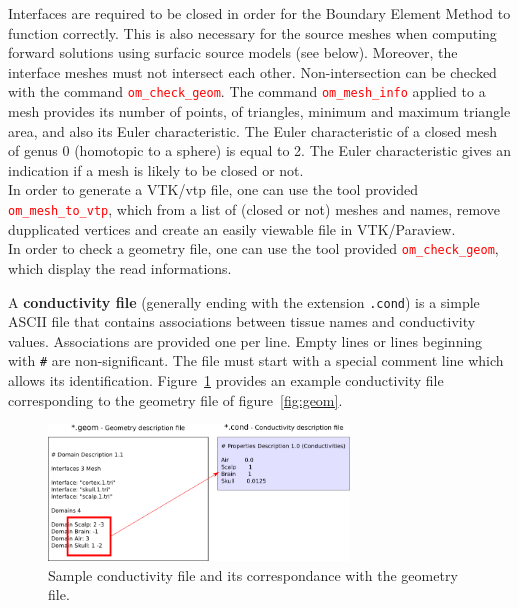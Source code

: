 \documentclass[10pt,journal]{book}
\newcommand{\example}[1]{\framebox[0.95\linewidth][l]{\parbox[t]{.93\linewidth}{\ttfamily \tiny #1}}}
\newcommand{\commandName}[1]{\textcolor{red}{\tt #1}}
\begin{document}
    Interfaces are required to be closed in order for the Boundary Element Method to function correctly. This is also necessary for the source meshes when computing forward solutions using surfacic source models (see below). Moreover, the interface meshes must not intersect each other. Non-intersection can be checked with the command \commandName{om\_check\_geom}. The command \commandName{om\_mesh\_info} applied to a mesh provides its number of points, of triangles, minimum and maximum triangle area, and also its Euler characteristic. The Euler characteristic of a closed mesh of genus 0 (homotopic to a sphere) is equal to 2. The Euler characteristic gives an indication if a mesh is likely to be closed or not.\\
    In order to generate a VTK/vtp file, one can use the tool provided \commandName{om\_mesh\_to\_vtp}, which from a list of (closed or not) meshes and names, remove dupplicated vertices and create an easily viewable file in VTK/Paraview.\\
    In order to check a geometry file, one can use the tool provided \commandName{om\_check\_geom}, which display the read informations.

\medskip
    A {\bf conductivity file} (generally ending with the extension {\tt .cond}) is a simple ASCII file that contains associations between tissue names and
    conductivity values. Associations are provided one per line. Empty lines or lines beginning with {\tt \#} are non-significant. The file must start
    with a special comment line which allows its identification. Figure~\ref{fig:cond} provides an example conductivity file corresponding to the geometry file of figure~\ref{fig:geom}.
    \begin{figure}
        \center
        \includegraphics[width=8cm]{cond.png}
        \caption{Sample conductivity file and its correspondance with the geometry file.}
    \label{fig:cond}
    \end{figure}
\end{document}
